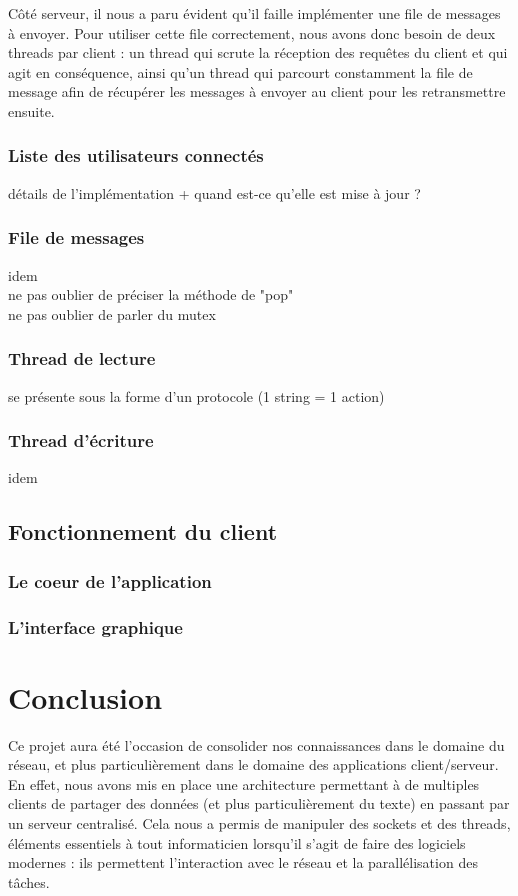 		Côté serveur, il nous a paru évident qu'il faille implémenter une file de messages à envoyer. Pour utiliser cette file correctement, nous avons donc besoin de deux threads par client : un thread qui scrute la réception des requêtes du client et qui agit en conséquence, ainsi qu'un thread qui parcourt constamment la file de message afin de récupérer les messages à envoyer au client pour les retransmettre ensuite.
	
		\subsection{Liste des utilisateurs connectés}
			détails de l'implémentation + quand est-ce qu'elle est mise à jour ?
			
		\subsection{File de messages}
			idem\\
			ne pas oublier de préciser la méthode de "pop"\\
			ne pas oublier de parler du mutex
			
		\subsection{Thread de lecture}
			se présente sous la forme d'un protocole (1 string = 1 action)
			
		\subsection{Thread d'écriture}
			idem
			
	
	\section{Fonctionnement du client}
		\subsection{Le coeur de l'application}
	
	
		\subsection{L'interface graphique}
			

\chapter*{Conclusion}
	Ce projet aura été l'occasion de consolider nos connaissances dans le domaine du réseau, et plus particulièrement dans le domaine des applications client/serveur. En effet, nous avons mis en place une architecture permettant à de multiples clients de partager des données (et plus particulièrement du texte) en passant par un serveur centralisé. Cela nous a permis de manipuler des sockets et des threads, éléments essentiels à tout informaticien lorsqu'il s'agit de faire des logiciels modernes : ils permettent l'interaction avec le réseau et la parallélisation des tâches.
	
